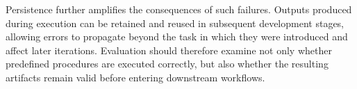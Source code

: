 Persistence further amplifies the consequences of such failures. Outputs produced during execution can be retained and reused in subsequent development stages, allowing errors to propagate beyond the task in which they were introduced and affect later iterations. Evaluation should therefore examine not only whether predefined procedures are executed correctly, but also whether the resulting artifacts remain valid before entering downstream workflows.

\begin{center}
\end{center}
